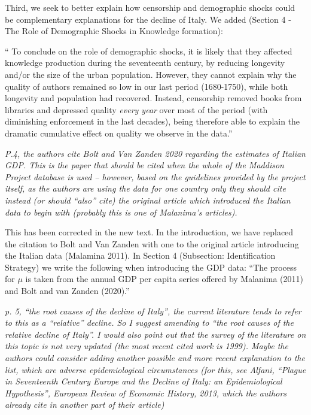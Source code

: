 \documentclass[12pt]{article}
\begin{document}
Third, we seek to better explain how censorship and demographic shocks could be complementary explanations for the decline of Italy. We added (Section 4  - The Role of Demographic Shocks in Knowledge formation):

 ``
To conclude on the role of demographic shocks, it is likely that they affected knowledge production during the seventeenth century, by reducing longevity and/or the size of the urban population. However, they cannot explain why the quality of authors remained so low in our last period (1680-1750), while both longevity and population had recovered. Instead, censorship removed books from libraries and depressed quality \textit{every year} over most of the period (with diminishing enforcement in the last decades), being therefore able to explain the dramatic cumulative effect on quality we observe in the data.''


\textit{
P.4, the authors cite Bolt and Van Zanden 2020 regarding the estimates of Italian GDP. This is the paper that should be cited when the whole of the Maddison Project database is used – however, based on the guidelines provided by the project itself, as the authors are using the data for one country only they should cite instead (or should “also” cite) the original article which introduced the Italian data to begin with (probably this is one of Malanima's articles).
}

This has been corrected in the new text. In the introduction, we have replaced the citation to Bolt and Van Zanden with one to the original article introducing the Italian data (Malamina 2011). In Section 4 (Subsection: Identification Strategy) we write the following when introducing the GDP data:  ``The process for $\mu$ is taken from the annual GDP per capita series offered by Malanima (2011) and Bolt and van Zanden (2020).''

\textit{
p. 5, “the root causes of the decline of Italy”, the current literature tends to refer to this as a “relative” decline. So I suggest amending to “the root causes of the relative decline of Italy”. I would also point out that the survey of the literature on this topic is not very updated (the most recent cited work is 1999). Maybe the authors could consider adding another possible and more recent explanation to the list, which are adverse epidemiological circumstances (for this, see Alfani, “Plague in Seventeenth Century Europe and the Decline of Italy: an Epidemiological Hypothesis”, European Review of Economic History, 2013, which the authors already cite in another part of their article)
}
\end{document}
